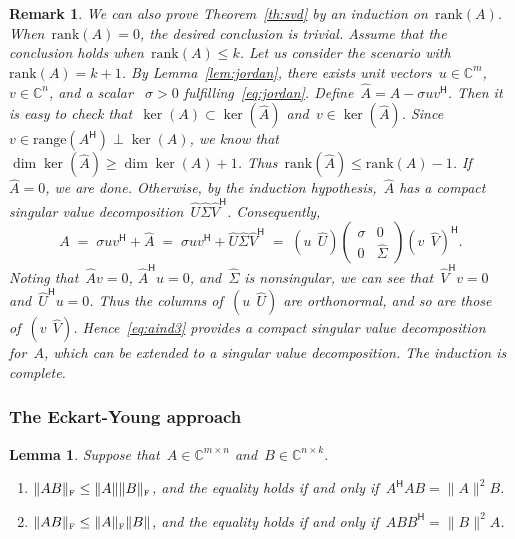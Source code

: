 \documentclass[11pt,a4paper]{article}  %
\numberwithin{equation}{section}
\newtheorem{lemma}{Lemma}%
\newtheorem{remark}{Remark}%
\theoremstyle{definition}
\def\CC{\mathbb{C}}
\newcommand{\fro}{{\scriptscriptstyle{\textnormal{F}}}}
\newcommand{\hmt}{{\scriptscriptstyle{{\mathsf{H}}}}}
\newcommand{\rank}{\mathrm{rank}}
\newcommand{\range}{\mathrm{range}}
\begin{document}
\begin{remark}
  We can also prove Theorem~\ref{th:svd} by an induction on~$\rank(A)$. When~$\rank(A) \!= 0$,
  the desired conclusion is trivial. Assume that the conclusion holds when~$\rank(A) \le k$. Let us consider
  the scenario with~$\rank(A) = k+1$. By Lemma~\ref{lem:jordan}, there exists unit
  vectors~$u\in\CC^{m}$, $v\in\CC^{n}$, and a scalar ~$\sigma>0$ fulfilling~\eqref{eq:jordan}.
  Define~$\hat{A} = A-\sigma uv^\hmt$. Then it is easy to check that~$\ker(A)\subset
  \ker(\hat{A})$ and~$v\in\ker(\hat{A})$. Since~$v\in\range(A^\hmt)\perp \ker(A)$, we know
  that~$\dim\ker(\hat{A})\ge \dim\ker(A)+1$. Thus~$\rank(\hat{A}) \le \rank(A)-1$.
  If~$\hat{A} = 0$, we are done. Otherwise, by the induction
  hypothesis,~$\hat{A}$ has a compact singular value decomposition~$\hat{U}\hat{\Sigma}\hat{V}^\hmt$.
  Consequently,
  \begin{equation}
    \label{eq:aind3}
    A\;=\; \sigma uv^\hmt + \hat{A} \;=\;
    \sigma uv^\hmt + \hat{U}\hat{\Sigma} \hat{V}^\hmt \;=\;
      (u\,\; \hat{U})
    \begin{pmatrix}
      \sigma & 0\\
      0 &\hat{\Sigma}
    \end{pmatrix}
    (v\,\; \hat{V})^\hmt.
  \end{equation}
  Noting that~$\hat{A}v = 0$, $\hat{A}^\hmt u = 0$, and~$\hat{\Sigma}$ is nonsingular, we can see
  that~$\hat{V}^\hmt v = 0$ and~$\hat{U}^\hmt u  = 0$. Thus the columns of~$(u\,\;\hat{U})$ are
  orthonormal, and so are those of~$(v\,\; \hat{V})$. Hence~\eqref{eq:aind3} provides a compact
  singular value decomposition for~$A$, which can be extended to a singular value decomposition. The
  induction is complete.
\end{remark}


\subsubsection{The Eckart-Young approach~\cite{Eckart_Young_1939}}

\begin{lemma}
  \label{lem:fro2}
  Suppose that~$A \in \CC^{m\times n}$ and~$B \in \CC^{n\times k}$.
  \begin{enumerate}[leftmargin=1.5em]
    \item $\|AB\|_\fro \le \|A\| \|B\|_\fro$, and the equality holds if and only if~$A^\hmt A B = \|A\|^2 B$.
    \item $\|AB\|_\fro \le \|A\|_\fro\|B\|$, and the equality holds if and only if~$ABB^\hmt = \|B\|^2 A$.
  \end{enumerate}
\end{lemma}
\end{document}
